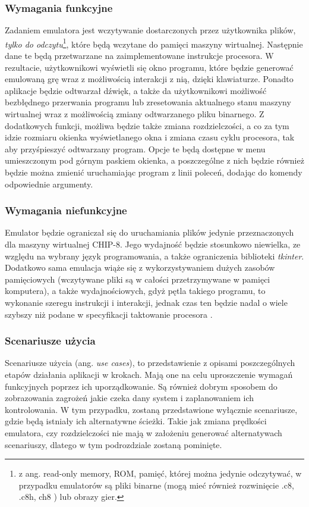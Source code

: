 \subsubsection{Wymagania funkcyjne}
Zadaniem emulatora jest wczytywanie dostarczonych przez użytkownika plików, \textit{tylko do odczytu}\footnote{z ang. read-only memory, ROM, pamięć, której można jedynie odczytywać, w przypadku emulatorów są pliki binarne (mogą mieć również rozwinięcie .c8, .c8h, ch8 ) lub obrazy gier. }, które będą wczytane do pamięci maszyny wirtualnej. Następnie dane te będą przetwarzane na zaimplementowane instrukcje procesora. W rezultacie, użytkownikowi wyświetli się okno programu, które będzie generować emulowaną grę wraz z możliwością interakcji z nią, dzięki klawiaturze. Ponadto aplikacje będzie odtwarzał dźwięk, a także da użytkownikowi możliwość bezbłędnego przerwania programu lub zresetowania aktualnego stanu maszyny wirtualnej wraz z możliwością zmiany odtwarzanego pliku binarnego. Z dodatkowych funkcji, możliwa będzie także zmiana rozdzielczości, a co za tym idzie rozmiaru okienka wyświetlanego okna i zmiana czasu cyklu procesora, tak aby przyśpieszyć odtwarzany program. Opcje te będą dostępne w menu umieszczonym pod górnym paskiem okienka, a poszczególne z nich będzie również będzie można zmienić uruchamiając program z linii poleceń, dodając do komendy odpowiednie argumenty.

\subsubsection{Wymagania niefunkcyjne}
Emulator będzie ograniczał się do uruchamiania plików jedynie przeznaczonych dla maszyny wirtualnej CHIP-8. Jego wydajność będzie stosunkowo niewielka, ze względu na wybrany język programowania, a także ograniczenia biblioteki \textit{tkinter}. Dodatkowo sama emulacja wiąże się z wykorzystywaniem dużych zasobów pamięciowych (wczytywane pliki są w całości przetrzymywane w pamięci komputera), a także wydajnościowych, gdyż pętla takiego programu, to wykonanie szeregu instrukcji i interakcji, jednak czas ten będzie nadal o wiele szybszy niż podane w specyfikacji taktowanie procesora \cite{Cowgod}.

\subsubsection{Scenariusze użycia}
Scenariusze użycia (ang. \textit{use cases}), to przedstawienie z opisami poszczególnych etapów działania aplikacji w krokach. Mają one na celu uproszczenie wymagań funkcyjnych poprzez ich uporządkowanie. Są również dobrym sposobem do zobrazowania zagrożeń jakie czeka dany system i zaplanowaniem ich kontrolowania. W tym przypadku, zostaną przedstawione wyłącznie scenariusze, gdzie będą istniały ich alternatywne ścieżki. Takie jak zmiana prędkości emulatora, czy rozdzielczości nie mają w założeniu generować alternatywach scenariuszy, dlatego w tym podrozdziale zostaną pominięte.\\

